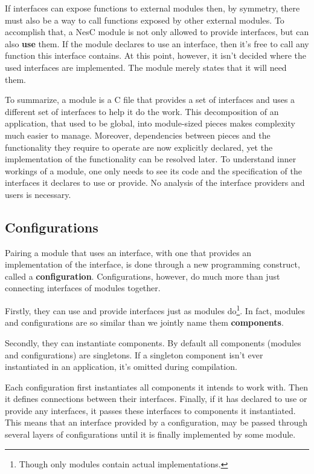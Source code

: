 If interfaces can expose functions to external modules then, by symmetry, there must also be a way to call functions exposed by other external modules. To accomplish that, a NesC module is not only allowed to provide interfaces, but can also {\bf use} them. If the module declares to use an interface, then it's free to call any function this interface contains. At this point, however, it isn't decided where the used interfaces are implemented. The module merely states that it will need them.

To summarize, a module is a C file that provides a set of interfaces and uses a different set of interfaces to help it do the work. This decomposition of an application, that used to be global, into module-sized pieces makes complexity much easier to manage. Moreover, dependencies between pieces and the functionality they require to operate are now explicitly declared, yet the implementation of the functionality can be resolved later. To understand inner workings of a module, one only needs to see its code and the specification of the interfaces it declares to use or provide. No analysis of the interface providers and users is necessary.

\subsection{Configurations}

Pairing a module that uses an interface, with one that provides an implementation of the interface, is done through a new programming construct, called a {\bf configuration}. Configurations, however, do much more than just connecting interfaces of modules together.

Firstly, they can use and provide interfaces just as modules do\footnote{Though only modules contain actual implementations.}. In fact, modules and configurations are so similar than we jointly name them {\bf components}.

Secondly, they can instantiate components. By default all components (modules and configurations) are singletons. If a singleton component isn't ever instantiated in an application, it's omitted during compilation.

Each configuration first instantiates all components it intends to work with. Then it defines connections between their interfaces. Finally, if it has declared to use or provide any interfaces, it passes these interfaces to components it instantiated.  This means that an interface provided by a configuration, may be passed through several layers of configurations until it is finally implemented by some module.

